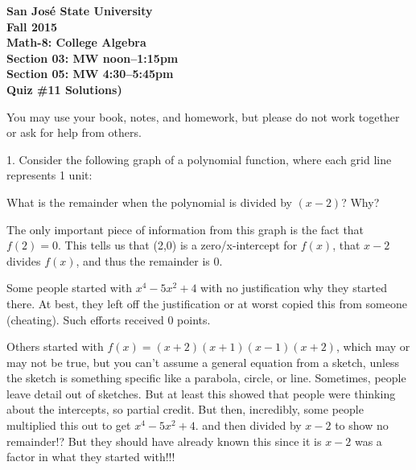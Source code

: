 \documentclass[letterpaper, 12pt]{article}
\begin{document}
\begin{center}
\bfseries
San Jos\'{e} State University \\
Fall 2015 \\
Math-8: College Algebra \\
Section 03: MW noon--1:15pm \\
Section 05: MW 4:30--5:45pm \\
\bigskip
Quiz \#11 Solutions)
\end{center}

\bigskip

You may use your book, notes, and homework, but please do not work together or
ask for help from others.

\bigskip

\newcommand{\fillin}{\rule{1.5in}{1pt}}

1. Consider the following graph of a polynomial function, where each grid line
represents 1 unit:

\bigskip

\begin{center}
\end{center}

\bigskip

What is the remainder when the polynomial is divided by $(x-2)$? Why?

\bigskip

The only important piece of information from this graph is the fact that
$f(2)=0$. This tells us that (2,0) is a zero/x-intercept for $f(x)$, that $x-2$
divides $f(x)$, and thus the remainder is 0.

\bigskip

Some people started with $x^4-5x^2+4$ with no justification why they started
there. At best, they left off the justification or at worst copied this from
someone (cheating). Such efforts received 0 points.

\bigskip

Others started with $f(x)=(x+2)(x+1)(x-1)(x+2)$, which may or may not be true,
but you can't assume a general equation from a sketch, unless the sketch is
something specific like a parabola, circle, or line. Sometimes, people leave
detail out of sketches. But at least this showed that people were thinking
about the intercepts, so partial credit. But then, incredibly, some people
multiplied this out to get $x^4-5x^2+4$. and then divided by $x-2$ to show no
remainder!? But they should have already known this since it is $x-2$ was a
factor in what they started with!!!
\end{document}
